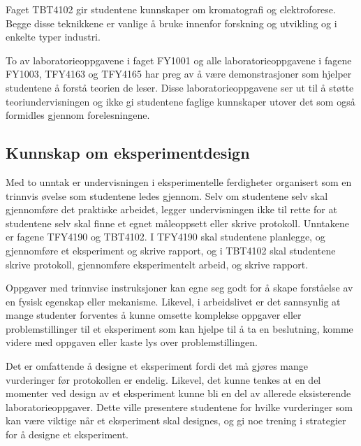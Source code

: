 \documentclass{article}
\begin{document}
Faget TBT4102 gir studentene kunnskaper om kromatografi og elektroforese. Begge disse teknikkene er vanlige å bruke innenfor forskning og utvikling og i enkelte typer industri.

To av laboratorieoppgavene i faget FY1001 og alle laboratorieoppgavene i fagene FY1003, TFY4163 og TFY4165 har preg av å være demonstrasjoner som hjelper studentene å forstå teorien de leser. Disse laboratorieoppgavene ser ut til å støtte teoriundervisningen og ikke gi studentene faglige kunnskaper utover det som også formidles gjennom forelesningene.

\subsection{Kunnskap om eksperimentdesign}
Med to unntak er undervisningen i eksperimentelle ferdigheter organisert som en trinnvis øvelse som studentene ledes gjennom. Selv om studentene selv skal gjennomføre det praktiske arbeidet, legger undervisningen ikke til rette for at studentene selv skal finne et egnet måleoppsett eller skrive protokoll. Unntakene er fagene TFY4190 og TBT4102. I TFY4190 skal studentene planlegge, og gjennomføre et eksperiment og skrive rapport, og i TBT4102 skal studentene skrive protokoll, gjennomføre eksperimentelt arbeid, og skrive rapport.

Oppgaver med trinnvise instruksjoner kan egne seg godt for å skape forståelse av en fysisk egenskap eller mekanisme. Likevel, i arbeidslivet er det sannsynlig at mange studenter forventes å kunne omsette komplekse oppgaver eller problemstillinger til et eksperiment som kan hjelpe til å ta en beslutning, komme videre med oppgaven eller kaste lys over problemstillingen.

Det er omfattende å designe et eksperiment fordi det må gjøres mange vurderinger før protokollen er endelig. Likevel, det kunne tenkes at en del momenter ved design av et eksperiment kunne bli en del av allerede eksisterende laboratorieoppgaver. Dette ville presentere studentene for hvilke vurderinger som kan være viktige når et eksperiment skal designes, og gi noe trening i strategier for å designe et eksperiment.
\end{document}
